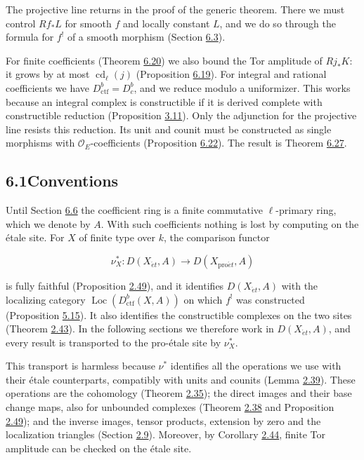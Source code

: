 \documentclass[11pt]{article}
\providecommand{\Dbc}{}\renewcommand{\Dbc}{D^b_c}
\providecommand{\Loc}{}\renewcommand{\Loc}{\operatorname{Loc}}
\begin{document}
The projective line returns in the proof of the generic theorem. There we must control \(Rf_*L\) for smooth \(f\) and locally constant \(L\), and we do so through the formula for \(f^!\) of a smooth morphism (Section \hyperref[bp536]{6.3}).

For finite coefficients (Theorem \hyperref[bp573]{6.20}) we also bound the Tor amplitude of \(Rj_*K\): it grows by at most \(\operatorname{cd}_\ell(j)\) (Proposition \hyperref[bp570]{6.19}). For integral and rational coefficients we have \(D^b_{\mathrm{ctf}}=\Dbc\), and we reduce modulo a uniformizer. This works because an integral complex is constructible if it is derived complete with constructible reduction (Proposition \hyperref[bp226]{3.11}). Only the adjunction for the projective line resists this reduction. Its unit and counit must be constructed as single morphisms with \(\mathcal O_E\)-coefficients (Proposition \hyperref[bp581]{6.22}). The result is Theorem \hyperref[bp596]{6.27}.

\subsection*{\texorpdfstring{6.1\quad Conventions}{6.1 Conventions}}
\label{bp515}%
\label{bp516}%
Until Section \hyperref[bp568]{6.6} the coefficient ring is a finite commutative \(\ell\)-primary ring, which we denote by \(A\). With such coefficients nothing is lost by computing on the étale site. For \(X\) of finite type over \(k\), the comparison functor

\[
\nu_X^*:D(X_{\acute{e}t},A)\longrightarrow D(X_{\mathrm{pro}\acute{e}t},A)
\]

is fully faithful (Proposition \hyperref[bp146]{2.49}), and it identifies \(D(X_{\acute{e}t},A)\) with the localizing category \(\Loc(D^b_{\mathrm{ctf}}(X,A))\) on which \(f^!\) was constructed (Proposition \hyperref[bp454]{5.15}). It also identifies the constructible complexes on the two sites (Theorem \hyperref[bp129]{2.43}). In the following sections we therefore work in \(D(X_{\acute{e}t},A)\), and every result is transported to the pro-étale site by \(\nu_X^*\).

This transport is harmless because \(\nu^*\) identifies all the operations we use with their étale counterparts, compatibly with units and counits (Lemma \hyperref[bp116]{2.39}). These operations are the cohomology (Theorem \hyperref[bp103]{2.35}); the direct images and their base change maps, also for unbounded complexes (Theorem \hyperref[bp113]{2.38} and Proposition \hyperref[bp146]{2.49}); and the inverse images, tensor products, extension by zero and the localization triangles (Section \hyperref[bp111]{2.9}). Moreover, by Corollary \hyperref[bp132]{2.44}, finite Tor amplitude can be checked on the étale site.
\end{document}
